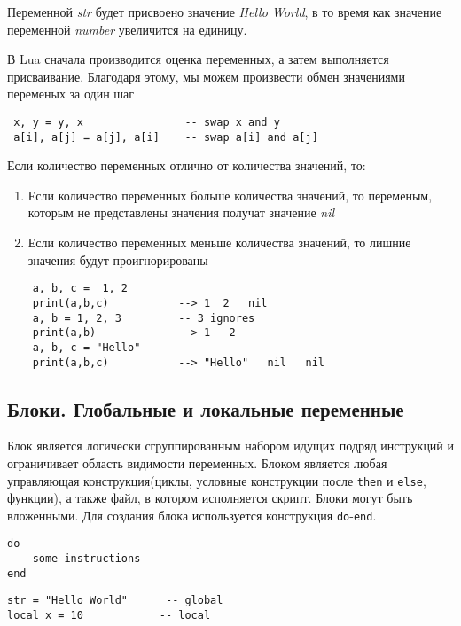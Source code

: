 Переменной \emph{str} будет присвоено значение \emph{Hello World}, в то время как значение переменной \emph{number} увеличится на единицу. 

В Lua сначала производится оценка переменных, а затем выполняется присваивание. Благодаря этому, мы можем произвести обмен значениями переменых за один шаг

\begin{lstlisting}
 x, y = y, x                -- swap x and y
 a[i], a[j] = a[j], a[i]    -- swap a[i] and a[j]
\end{lstlisting}

Если количество переменных отлично от количества значений, то:
\begin{enumerate}
	\item Если количество переменных больше количества значений, то переменым, которым не представлены значения получат значение \emph{nil}
	\item Если количество переменных меньше количества значений, то лишние значения будут проигнорированы
\end{enumerate}

\begin{lstlisting}
    a, b, c =  1, 2
    print(a,b,c)           --> 1  2   nil
    a, b = 1, 2, 3   	   -- 3 ignores
    print(a,b)             --> 1   2
    a, b, c = "Hello"
    print(a,b,c)           --> "Hello"   nil   nil
\end{lstlisting}

\subsection{Блоки. Глобальные и локальные переменные} 

Блок является логически сгруппированным набором идущих подряд инструкций и ограничивает область видимости переменных. Блоком является любая управляющая конструкция(циклы, условные конструкции после \lstinline{then} и \lstinline{else}, функции), а также файл, в котором исполняется скрипт. Блоки могут быть вложенными. Для создания блока используется конструкция \lstinline{do}-\lstinline{end}.

\begin{lstlisting}
do
  --some instructions
end         
\end{lstlisting}

\begin{lstlisting}
str = "Hello World"      -- global
local x = 10 			-- local
\end{lstlisting}


